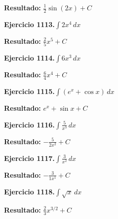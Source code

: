 \documentclass[10pt,a4paper]{article}
\begin{document}
\begin{solbox}
\textbf{Resultado:} \(\displaystyle \frac{1}{2}\sin(2x) + C\)
\end{solbox}

\begin{ejbox}
\textbf{Ejercicio 1113.}\quad $\int 2x^{4}\,dx$
\end{ejbox}

\begin{solbox}
\textbf{Resultado:} \(\displaystyle \frac{2}{5}x^{5} + C\)
\end{solbox}

\newpage
\begin{ejbox}
\textbf{Ejercicio 1114.}\quad $\int 6x^{3}\,dx$
\end{ejbox}

\begin{solbox}
\textbf{Resultado:} \(\displaystyle \frac{6}{4}x^{4} + C\)
\end{solbox}

\begin{ejbox}
\textbf{Ejercicio 1115.}\quad $\int (e^x + \cos x)\,dx$
\end{ejbox}

\begin{solbox}
\textbf{Resultado:} \(\displaystyle e^x + \sin x + C\)
\end{solbox}

\begin{ejbox}
\textbf{Ejercicio 1116.}\quad $\int \frac{5}{x^{3}}\,dx$
\end{ejbox}

\begin{solbox}
\textbf{Resultado:} \(\displaystyle -\frac{5}{2x^{2}} + C\)
\end{solbox}

\newpage
\begin{ejbox}
\textbf{Ejercicio 1117.}\quad $\int \frac{3}{x^{2}}\,dx$
\end{ejbox}

\begin{solbox}
\textbf{Resultado:} \(\displaystyle -\frac{3}{1x^{1}} + C\)
\end{solbox}

\begin{ejbox}
\textbf{Ejercicio 1118.}\quad $\int \sqrt{x}\,dx$
\end{ejbox}

\begin{solbox}
\textbf{Resultado:} \(\displaystyle \frac{2}{3}x^{3/2} + C\)
\end{solbox}
\end{document}
